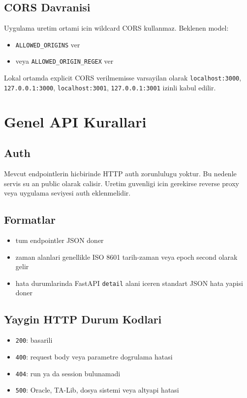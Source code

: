 \documentclass[11pt,a4paper]{article}
\begin{document}
\subsection{CORS Davranisi}

Uygulama uretim ortami icin wildcard CORS kullanmaz. Beklenen model:

\begin{itemize}[leftmargin=1.5em]
    \item \texttt{ALLOWED\_ORIGINS} ver
    \item veya \texttt{ALLOWED\_ORIGIN\_REGEX} ver
\end{itemize}

Lokal ortamda explicit CORS verilmemisse varsayilan olarak \texttt{localhost:3000}, \texttt{127.0.0.1:3000}, \texttt{localhost:3001}, \texttt{127.0.0.1:3001} izinli kabul edilir.

\section{Genel API Kurallari}

\subsection{Auth}

Mevcut endpointlerin hicbirinde HTTP auth zorunlulugu yoktur. Bu nedenle servis su an public olarak calisir. Uretim guvenligi icin gerekirse reverse proxy veya uygulama seviyesi auth eklenmelidir.

\subsection{Formatlar}

\begin{itemize}[leftmargin=1.5em]
    \item tum endpointler JSON doner
    \item zaman alanlari genellikle ISO 8601 tarih-zaman veya epoch second olarak gelir
    \item hata durumlarinda FastAPI \texttt{detail} alani iceren standart JSON hata yapisi doner
\end{itemize}

\subsection{Yaygin HTTP Durum Kodlari}

\begin{itemize}[leftmargin=1.5em]
    \item \texttt{200}: basarili
    \item \texttt{400}: request body veya parametre dogrulama hatasi
    \item \texttt{404}: run ya da session bulunamadi
    \item \texttt{500}: Oracle, TA-Lib, dosya sistemi veya altyapi hatasi
\end{itemize}
\end{document}
